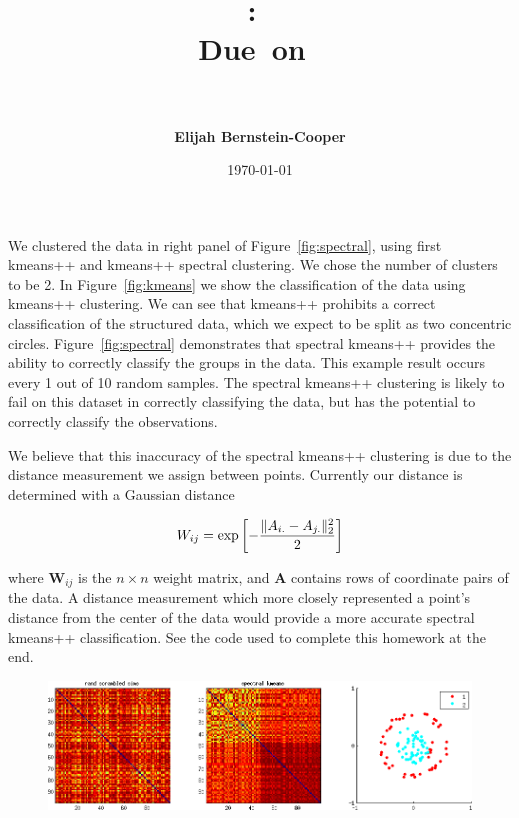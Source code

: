 \documentclass{article}
\title{\vspace{0in}
    \textmd{\textbf{\hmwkClass:\ \hmwkTitle}}\\
    \normalsize\vspace{0.1in}\small{Due\ on\ \hmwkDueDate}\\
    \vspace{0.1in}\large{\textit{\hmwkClassInstructor\ \hmwkClassTime}}
    \vspace{0.5in}}
\author{\textbf{Elijah Bernstein-Cooper}}
\date{\today} %
\begin{document}
\maketitle

\begin{homeworkProblem}
  
    We clustered the data in right panel of Figure~\ref{fig:spectral}, using
    first kmeans++ and kmeans++ spectral clustering. We chose the number of
    clusters to be 2. In Figure~\ref{fig:kmeans} we show the classification of
    the data using kmeans++ clustering. We can see that kmeans++ prohibits a
    correct classification of the structured data, which we expect to be split
    as two concentric circles. Figure~\ref{fig:spectral} demonstrates that
    spectral kmeans++ provides the ability to correctly classify the groups in
    the data. This example result occurs every 1 out of 10 random samples. The
    spectral kmeans++ clustering is likely to fail on this dataset in correctly
    classifying the data, but has the potential to correctly classify the
    observations.

    We believe that this inaccuracy of the spectral kmeans++ clustering is due
    to the distance measurement we assign between points. Currently our
    distance is determined with a Gaussian distance

    \begin{equation}
        W_{ij} = {\rm exp}\left[-\frac{\|A_{i.} - A_{j.}\|^2_2}{2}\right]
    \end{equation}

    \noindent where $\bm{W}_{ij}$ is the $n \times n$ weight matrix, and
    $\bm{A}$ contains rows of coordinate pairs of the data. A distance
    measurement which more closely represented a point's distance from the
    center of the data would provide a more accurate spectral kmeans++
    classification. See the code used to complete this homework at the end.

    \begin{figure}[!ht]
        
        \begin{centering}
        
        \includegraphics[width=\linewidth]{hw9_fig_spectral_kmeans.png}


\end{centering}
\end{figure}
\end{homeworkProblem}
\end{document}

